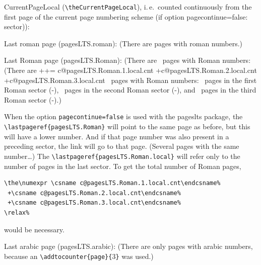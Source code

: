 \documentclass[british]{article}[2024/06/29]%
\def\pagesLTSexampleArabic{3}
\begin{document}
CurrentPageLocal (\verb|\theCurrentPageLocal|),
i.\,e.~counted continuously from the first page of the
current page numbering scheme (if option pagecontinue=false: sector)): \theCurrentPageLocal \bigskip

Last roman page (pagesLTS.roman): 
(There are  pages with roman numbers.)\bigskip

Last Roman page (pagesLTS.Roman): %
\makeatletter%
\ifpagesLTS@pagecontinue%
  (There are ~pages with Roman numbers:\newline
\else%
  (There are %
  ++=%
   \the\numexpr%
    \csname c@pagesLTS.Roman.1.local.cnt\endcsname%
   +\csname c@pagesLTS.Roman.2.local.cnt\endcsname%
   +\csname c@pagesLTS.Roman.3.local.cnt\endcsname%
   \relax~pages with Roman numbers:\newline
\fi%
\makeatother%
~pages in the first Roman sector
(\pageref{Roman}{\hskip3em }-),\newline
{}~pages in the second Roman sector
(\pageref{Roman2}{\hskip3em }-), and\newline
{}~pages in the third Roman sector
(\pageref{Roman3}{\hskip3em }-).)\newline

When the option \texttt{pagecontinue=false} is used with the
\textsf{pageslts} package, the \verb|\lastpageref{pagesLTS.Roman}| will
point to the same page as before, but this will have a lower number.
And if that page number was also present in a preceding sector,
the link will go to that page. (Several pages with the same number\ldots)\newline
The \verb|\lastpageref{pagesLTS.Roman.local}| will refer only to the number
of pages in the last sector. To get the total number of Roman pages, %
\begin{verbatim}
\the\numexpr \csname c@pagesLTS.Roman.1.local.cnt\endcsname%
 +\csname c@pagesLTS.Roman.2.local.cnt\endcsname%
 +\csname c@pagesLTS.Roman.3.local.cnt\endcsname%
\relax%
\end{verbatim}%
would be necessary.
\pagebreak

Last arabic page (pagesLTS.arabic): 
(There are only  pages with arabic numbers,
because an \verb|\addtocounter{page}{|\pagesLTSexampleArabic\verb|}| was used.)\bigskip
\end{document}
